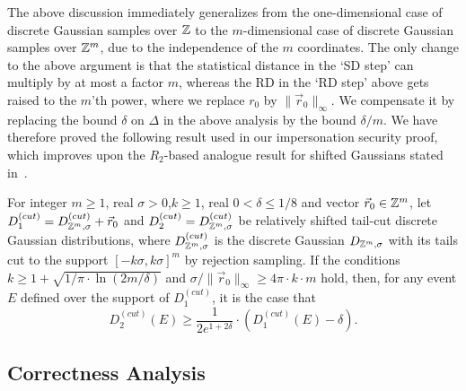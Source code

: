 The above discussion immediately generalizes from the one-dimensional case of
discrete Gaussian samples over $\mathbb{Z}$ to the $m$-dimensional case of discrete
Gaussian samples over $\mathbb{Z}^m$, due to the independence of the $m$
coordinates. The only change to the above argument is that the statistical
distance in the `SD step' can multiply by at most a factor $m$, whereas the RD
in the `RD step' above gets raised to the $m$'th power, where we replace $r_0$
by $\|\vec{r}_0\|_{\infty}$. We compensate it by replacing the bound
$\delta$ on $\Delta$ in the above analysis by the bound $\delta/m$. We have
therefore proved the following result used in our impersonation security proof,
which improves upon the $R_2$-based analogue result for shifted Gaussians stated
in~\cite{langlois2014gghlite}.


\begin{lemma} \label{le:Renyi} For integer $m \geq 1$, real
  $\sigma>0$,$k \geq 1$, real $0<\delta \leq 1/8$ and vector
  $\vec{r}_0 \in \mathbb{Z}^m$, let
  $D_1^{(cut)} = D_{\mathbb{Z}^m,\sigma}^{(cut)} + \vec{r}_0$ and
  $D_2^{(cut)} = D_{\mathbb{Z}^m,\sigma}^{(cut)}$ be relatively shifted tail-cut
  discrete Gaussian distributions, where $D_{\mathbb{Z}^m,\sigma}^{(cut)}$ is the
  discrete Gaussian $D_{\mathbb{Z}^m,\sigma}$ with its tails cut to the support
  $[-k\sigma,k\sigma]^m$ by rejection sampling. If the conditions
  $k \geq 1 + \sqrt{1/\pi \cdot \ln(2m/\delta)}$ and
  $\sigma/\|\vec{r}_0\|_{\infty} \geq 4 \pi \cdot k \cdot m$ hold, then, for any
  event $E$ defined over the support of $D_1^{(cut)}$, it is the case that
$$
D_2^{(cut)}(E) \geq \frac{1}{2e^{1+2\delta}} \cdot \left(D_1^{(cut)}(E) - \delta\right).
$$
\end{lemma}

\subsection{Correctness Analysis}
\label{sec:2correctness}

